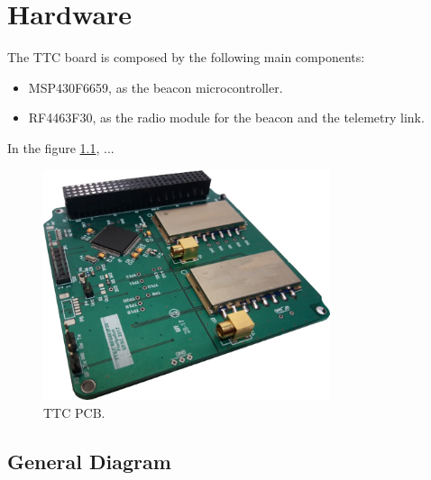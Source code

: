%
%
%
%
%

%
%
%
%
%
%

\chapter{Hardware} \label{ch:hardware}

The TTC board is composed by the following main components:

\begin{itemize}
	\item MSP430F6659, as the beacon microcontroller.
	\item RF4463F30, as the radio module for the beacon and the telemetry link.
\end{itemize}

In the figure \ref{fig:ttc-board}, ...

\begin{figure}[!h]
	\begin{center}
		\includegraphics[width=0.75\textwidth]{figures/ttc_board.png}
		\caption{TTC PCB.}
		\label{fig:ttc-board}
	\end{center}
\end{figure}

\section{General Diagram}

